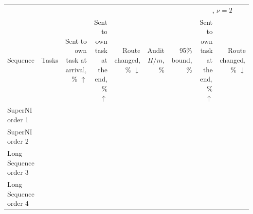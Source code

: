 {\scriptsize\setlength{\tabcolsep}{2.5pt}\begin{tabular}{p{0.85in}rrrrrrrr}
    \toprule
    & & \multicolumn{5}{c}{\recog{}} & \multicolumn{2}{c}{\handicap{}, $\nu = 2$} \\
    \cmidrule(lr){3-7}\cmidrule(l){8-9}
    Sequence & Tasks & \shortstack[r]{Sent\\to own\\task\\at\\arrival,\\\% $\uparrow$} & \shortstack[r]{Sent\\to own\\task\\at the\\end,\\\% $\uparrow$} & \shortstack[r]{Route\\changed,\\\% $\downarrow$} & \shortstack[r]{Audit\\$H/m$, \%} & \shortstack[r]{95\% bound,\\\%} & \shortstack[r]{Sent\\to own\\task\\at the\\end,\\\% $\uparrow$} & \shortstack[r]{Route\\changed,\\\% $\downarrow$} \\
    \midrule
    SuperNI order 1 & \AudScaleSuperniOneTasks{} & \AudScaleSuperniOneArrive{} & \AudScaleSuperniOneEnd{} & \AudScaleSuperniOneChanged{} & \AudScaleSuperniOneAuditEst{} & \AudScaleSuperniOneAuditBound{} & \AudScaleSuperniOneHEnd{} & \AudScaleSuperniOneHChanged{} \\
    SuperNI order 2 & \AudScaleSuperniTwoTasks{} & \AudScaleSuperniTwoArrive{} & \AudScaleSuperniTwoEnd{} & \AudScaleSuperniTwoChanged{} & \AudScaleSuperniTwoAuditEst{} & \AudScaleSuperniTwoAuditBound{} & \AudScaleSuperniTwoHEnd{} & \AudScaleSuperniTwoHChanged{} \\
    Long Sequence order 3 & \AudScaleLongThreeTasks{} & \AudScaleLongThreeArrive{} & \AudScaleLongThreeEnd{} & \AudScaleLongThreeChanged{} & \AudScaleLongThreeAuditEst{} & \AudScaleLongThreeAuditBound{} & \AudScaleLongThreeHEnd{} & \AudScaleLongThreeHChanged{} \\
    Long Sequence order 4 & \AudScaleLongFourTasks{} & \AudScaleLongFourArrive{} & \AudScaleLongFourEnd{} & \AudScaleLongFourChanged{} & \AudScaleLongFourAuditEst{} & \AudScaleLongFourAuditBound{} & \AudScaleLongFourHEnd{} & \AudScaleLongFourHChanged{} \\

\end{tabular}}
